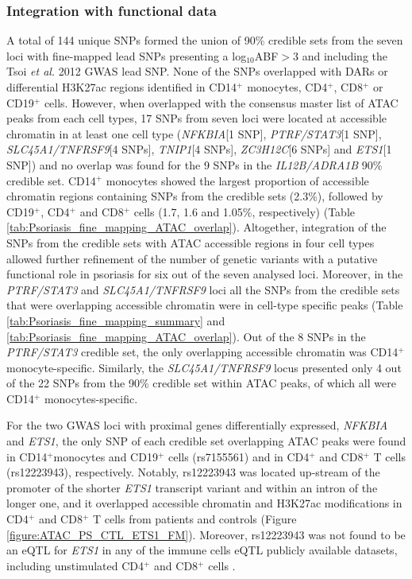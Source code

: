 \subsubsection{Integration with functional data}

A total of 144 unique SNPs formed the union of 90\% credible sets from the seven loci with fine-mapped lead SNPs presenting a log$_{10}$ABF$>$3 and including the Tsoi \textit{et al.} 2012 GWAS lead SNP. None of the SNPs overlapped with DARs or differential H3K27ac regions identified in CD14$^+$ monocytes, CD4$^+$, CD8$^+$ or CD19$^+$ cells. However, when overlapped with the consensus master list of ATAC peaks from each cell types, 17 SNPs from seven loci were located at accessible chromatin in at least one cell type (\textit{NFKBIA}[1 SNP], \textit{PTRF/STAT3}[1 SNP], \textit{SLC45A1/TNFRSF9}[4 SNPs], \textit{TNIP1}[4 SNPs], \textit{ZC3H12C}[6 SNPs] and \textit{ETS1}[1 SNP]) and no overlap was found for the 9 SNPs in the \textit{IL12B/ADRA1B} 90\% credible set. CD14$^+$ monocytes showed the largest proportion of accessible chromatin regions containing SNPs from the credible sets (2.3\%), followed by CD19$^+$, CD4$^+$ and CD8$^+$ cells (1.7, 1.6 and 1.05\%, respectively) (Table \ref{tab:Psoriasis_fine_mapping_ATAC_overlap}). Altogether, integration of the SNPs from the credible sets with ATAC accessible regions in four cell types allowed further refinement of the number of genetic variants with a putative functional role in psoriasis for six out of the seven analysed loci. Moreover, in the \textit{PTRF/STAT3} and \textit{SLC45A1/TNFRSF9} loci all the SNPs from the credible sets that were overlapping accessible chromatin were in cell-type specific peaks (Table \ref{tab:Psoriasis_fine_mapping_summary} and \ref{tab:Psoriasis_fine_mapping_ATAC_overlap}). Out of the 8 SNPs in the \textit{PTRF/STAT3} credible set, the only overlapping accessible chromatin was CD14$^+$ monocyte-specific. Similarly, the \textit{SLC45A1/TNFRSF9} locus presented only 4 out of the 22 SNPs from the 90\% credible set within ATAC peaks, of which all were CD14$^+$ monocytes-specific.   

For the two GWAS loci with proximal genes differentially expressed, \textit{NFKBIA} and \textit{ETS1}, the only SNP of each credible set overlapping ATAC peaks were found in CD14$^+$monocytes and CD19$^+$ cells (rs7155561) and in CD4$^+$ and CD8$^+$ T cells (rs12223943), respectively. Notably, rs12223943 was located up-stream of the promoter of the shorter \textit{ETS1} transcript variant and within an intron of the longer one, and it overlapped accessible chromatin and H3K27ac modifications in CD4$^+$ and CD8$^+$ T cells from patients and controls (Figure \ref{figure:ATAC_PS_CTL_ETS1_FM}). Moreover, rs12223943 was not found to be an eQTL for \textit{ETS1} in any of the immune cells eQTL publicly available datasets, including unstimulated CD4$^+$ and CD8$^+$ cells \parencite{Kasela2017}.



